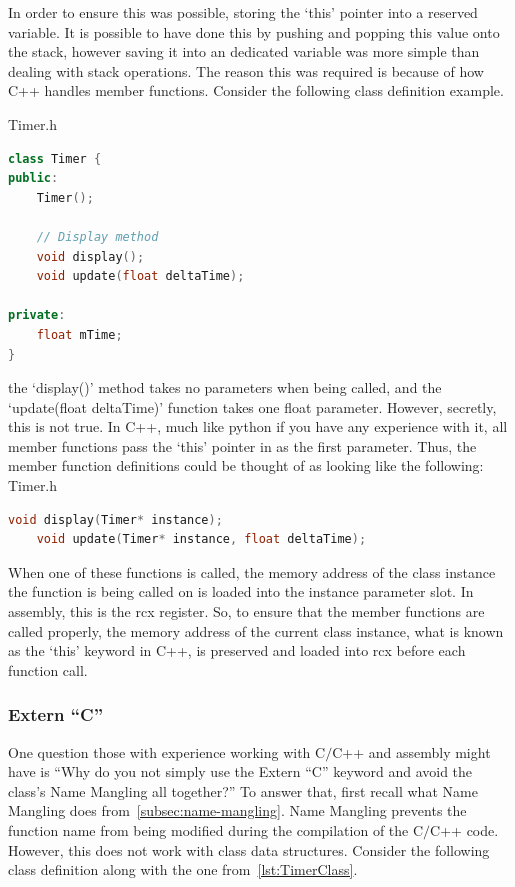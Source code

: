 \documentclass[twoside]{article}
\begin{document}
    \bigbreak
    \noindent
    In order to ensure this was possible, storing the `this' pointer into a reserved variable.
    It is possible to have done this by pushing and popping this value onto the stack, however saving it into an dedicated variable was more simple than dealing with stack operations.
    The reason this was required is because of how C++ handles member functions.
    Consider the following class definition example.

    \bigbreak
    \noindent
    Timer.h
    \begin{lstlisting}[language=C++,label={lst:TimerClass}]
class Timer {
public:
    Timer();

    // Display method
    void display();
    void update(float deltaTime);

private:
    float mTime;
}
    \end{lstlisting}

    \bigbreak
    \noindent
    the `display()' method takes no parameters when being called, and the `update(float deltaTime)' function takes one float parameter.
    However, secretly, this is not true.
    In C++, much like python if you have any experience with it, all member functions pass the `this' pointer in as the first parameter.
    Thus, the member function definitions could be thought of as looking like the following:
    \bigbreak
    \noindent
    Timer.h
    \begin{lstlisting}[language=C++,label={lst:TimerClassFunctionsWithThis}]
    void display(Timer* instance);
    void update(Timer* instance, float deltaTime);
    \end{lstlisting}

    \bigbreak
    \noindent
    When one of these functions is called, the memory address of the class instance the function is being called on is loaded into the instance parameter slot.
    In assembly, this is the rcx register.
    So, to ensure that the member functions are called properly, the memory address of the current class instance, what is known as the `this' keyword in C++, is preserved and loaded into rcx before each function call.



    \subsubsection{Extern ``C''}
    One question those with experience working with C$/$C++ and assembly might have is ``Why do you not simply use the Extern ``C'' keyword and avoid the class's Name Mangling all together?''
    To answer that, first recall what Name Mangling does from~\ref{subsec:name-mangling}.
    Name Mangling prevents the function name from being modified during the compilation of the C$/$C++ code.
    However, this does not work with class data structures.
    Consider the following class definition along with the one from~\ref{lst:TimerClass}.
    \bigbreak
\end{document}
